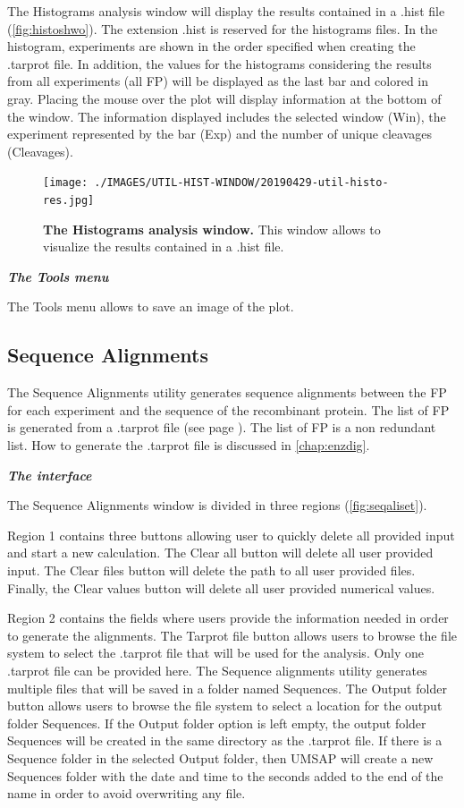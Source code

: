 The Histograms analysis window will display the results contained in a .hist file (\autoref{fig:histoshwo}). The extension .hist is reserved for the histograms files. In the histogram, experiments are shown in the order specified when creating the .tarprot file. In addition, the values for the histograms considering the results from all experiments (all FP) will be displayed as the last bar and colored in gray. Placing the mouse over the plot will display information at the bottom of the window. The information displayed includes the selected window (Win), the experiment represented by the bar (Exp) and the number of unique cleavages (Cleavages).

\begin{figure}[h]
	\centering
	\texttt{[image: ./IMAGES/UTIL-HIST-WINDOW/20190429-util-histo-res.jpg]}	    
	\caption[The Histograms analysis window]{\textbf{The Histograms analysis window.} This window allows to visualize the results contained in a .hist file.} 
	\label{fig:histoshwo}
	\vspace{-5pt} 	
\end{figure}

\textit{\textbf{The Tools menu}}

The Tools menu allows to save an image of the plot.

\subsection{Sequence Alignments}
\label{subsec:seqali}
The Sequence Alignments utility generates sequence alignments between the FP for each experiment and the sequence of the recombinant protein. The list of FP is generated from a .tarprot file (see page \pageref{par:PIP}). The list of FP is a non redundant list. How to generate the .tarprot file is discussed in \autoref{chap:enzdig}.

\textit{\textbf{The interface}}

The Sequence Alignments window is divided in three regions (\autoref{fig:seqaliset}).

Region \num{1} contains three buttons allowing user to quickly delete all provided input and start a new calculation. The Clear all button will delete all user provided input. The Clear files button will delete the path to all user provided files. Finally, the Clear values button will delete all user provided numerical values.

Region \num{2} contains the fields where users provide the information needed in order to generate the alignments. The Tarprot file button allows users to browse the file system to select the .tarprot file that will be used for the analysis. Only one .tarprot file can be provided here. The Sequence alignments utility generates multiple files that will be saved in a folder named Sequences. The Output folder button allows users to browse the file system to select a location for the output folder Sequences. If the Output folder option is left empty, the output folder Sequences will be created in the same directory as the .tarprot file. If there is a Sequence folder in the selected Output folder, then UMSAP will create a new Sequences folder with the date and time to the seconds added to the end of the name in order to avoid overwriting any file. 

